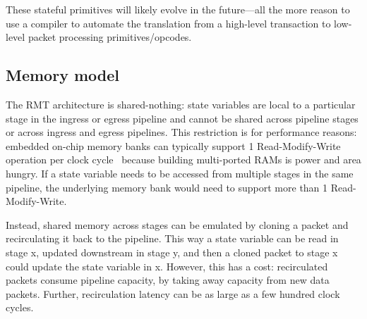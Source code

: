 
These stateful primitives will likely evolve in the future---all the more
reason to use a compiler to automate the translation from a high-level
transaction to low-level packet processing primitives/opcodes.

\subsection{Memory model}

The RMT architecture is shared-nothing: state variables are local to a
particular stage in the ingress or egress pipeline and cannot be shared across
pipeline stages or across ingress and egress pipelines. This restriction is for
performance reasons: embedded on-chip memory banks can typically support 1
Read-Modify-Write operation per clock cycle~\cite{some_citation_from_memoir}
because building multi-ported RAMs is power and area hungry. If a state
variable needs to be accessed from multiple stages in the same pipeline, the
underlying memory bank would need to support more than 1 Read-Modify-Write.

Instead, shared memory across stages can be emulated by cloning a packet and
recirculating it back to the pipeline. This way a state variable can be read in
stage x, updated downstream in stage y, and then a cloned packet to stage x
could update the state variable in x. However, this has a cost: recirculated
packets consume pipeline capacity, by taking away capacity from new data
packets.  Further, recirculation latency can be as large as a few hundred clock
cycles.
